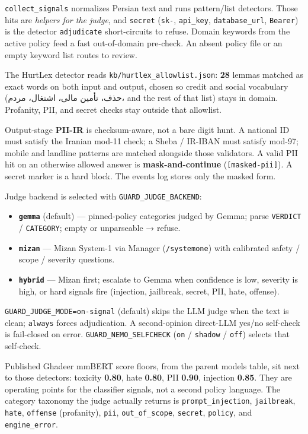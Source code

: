 \texttt{collect\_signals} normalizes Persian text and runs pattern/list detectors. Those hits are \emph{helpers for the judge}, and \texttt{secret} (\texttt{sk-}, \texttt{api\_key}, \texttt{database\_url}, \texttt{Bearer}) is the detector \texttt{adjudicate} short-circuits to refuse. Domain keywords from the active policy feed a fast out-of-domain pre-check. An absent policy file or an empty keyword list routes to review.

The HurtLex detector reads \texttt{kb/hurtlex\_allowlist.json}: \textbf{28} lemmas matched as exact words on both input and output, chosen so credit and social vocabulary (حذف، تأمین مالی، اشتغال، مردم، and the rest of that list) stays in domain. Profanity, PII, and secret checks stay outside that allowlist.

Output-stage \textbf{PII-IR} is checksum-aware, not a bare digit hunt. A national ID must satisfy the Iranian mod-11 check; a Sheba / IR-IBAN must satisfy mod-97; mobile and landline patterns are matched alongside those validators. A valid PII hit on an otherwise allowed answer is \textbf{mask-and-continue} (\texttt{{[}masked-pii{]}}). A secret marker is a hard block. The events log stores only the masked form.

Judge backend is selected with \texttt{GUARD\_JUDGE\_BACKEND}:

\begin{itemize}
\item
  \textbf{\texttt{gemma}} (default) --- pinned-policy categories judged by Gemma; parse \texttt{VERDICT} / \texttt{CATEGORY}; empty or unparseable → refuse.
\item
  \textbf{\texttt{mizan}} --- Mizan System-1 via Manager (\texttt{/systemone}) with calibrated safety / scope / severity questions.
\item
  \textbf{\texttt{hybrid}} --- Mizan first; escalate to Gemma when confidence is low, severity is high, or hard signals fire (injection, jailbreak, secret, PII, hate, offense).
\end{itemize}

\texttt{GUARD\_JUDGE\_MODE=on-signal} (default) skips the LLM judge when the text is clean; \texttt{always} forces adjudication. A second-opinion direct-LLM yes/no self-check is fail-closed on error. \texttt{GUARD\_NEMO\_SELFCHECK} (\texttt{on} / \texttt{shadow} / \texttt{off}) selects that self-check.

Published Ghadeer mmBERT score floors, from the parent models table, sit next to those detectors: toxicity \textbf{0.80}, hate \textbf{0.80}, PII \textbf{0.90}, injection \textbf{0.85}. They are operating points for the classifier signals, not a second policy language. The category taxonomy the judge actually returns is \texttt{prompt\_injection}, \texttt{jailbreak}, \texttt{hate}, \texttt{offense} (profanity), \texttt{pii}, \texttt{out\_of\_scope}, \texttt{secret}, \texttt{policy}, and \texttt{engine\_error}.

